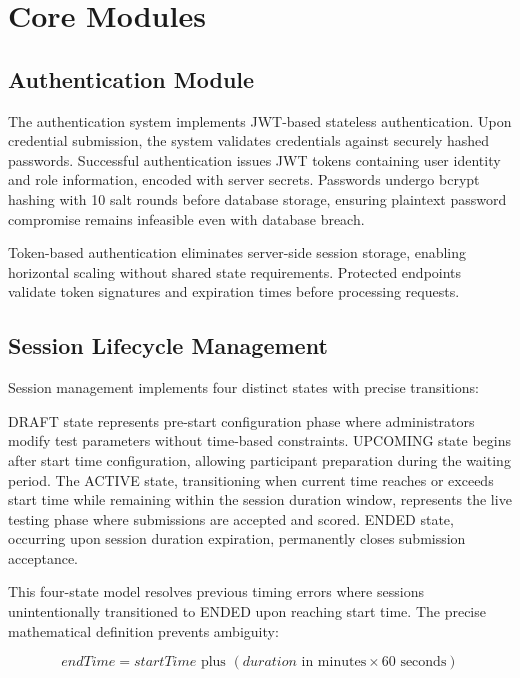 \documentclass[12pt,a4paper]{report}
\begin{document}
\section{Core Modules}

\subsection{Authentication Module}

The authentication system implements JWT-based stateless authentication. Upon credential submission, the system validates credentials against securely hashed passwords. Successful authentication issues JWT tokens containing user identity and role information, encoded with server secrets. Passwords undergo bcrypt hashing with 10 salt rounds before database storage, ensuring plaintext password compromise remains infeasible even with database breach.

Token-based authentication eliminates server-side session storage, enabling horizontal scaling without shared state requirements. Protected endpoints validate token signatures and expiration times before processing requests.

\subsection{Session Lifecycle Management}

Session management implements four distinct states with precise transitions:

DRAFT state represents pre-start configuration phase where administrators modify test parameters without time-based constraints. UPCOMING state begins after start time configuration, allowing participant preparation during the waiting period. The ACTIVE state, transitioning when current time reaches or exceeds start time while remaining within the session duration window, represents the live testing phase where submissions are accepted and scored. ENDED state, occurring upon session duration expiration, permanently closes submission acceptance.

This four-state model resolves previous timing errors where sessions unintentionally transitioned to ENDED upon reaching start time. The precise mathematical definition prevents ambiguity:

\begin{equation*}
  \textit{endTime} = \textit{startTime} \text{ plus } (\textit{duration} \text{ in minutes} \times 60 \text{ seconds})
\end{equation*}
\end{document}
